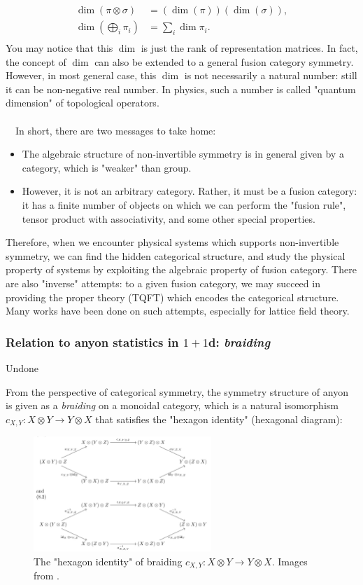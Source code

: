 \documentclass{ltjsarticle}
\theoremstyle{mystyle} %
\numberwithin{equation}{section}
\begin{document}
  \begin{align}
    \dim{(\pi \otimes \sigma)} &= (\dim(\pi))(\dim(\sigma)), \\
    \dim(\bigoplus_i \pi_i) &= \sum_i \dim{\pi_i}. \\
  \label{dim}
  \end{align}
  You may notice that this $\dim$ is just the rank of representation matrices. 
  In fact, the concept of $\dim$ can also be extended to a general fusion category symmetry. 
  However, in most general case, this $\dim$ is not necessarily a natural number: still it can be non-negative real number. 
  In physics, such a number is called "quantum dimension" of topological operators. 
  \\
  \\
  　In short, there are two messages to take home: 
  \begin{itemize}
    \item The algebraic structure of non-invertible symmetry is in general given by a category, which is "weaker" than group. 
    \item However, it is not an arbitrary category. Rather, it must be a fusion category:
     it has a finite number of objects on which we can perform the "fusion rule", tensor product with associativity, and some other special properties. 
  \end{itemize}
Therefore, when we encounter physical systems which supports non-invertible symmetry, 
we can find the hidden categorical structure, and study the physical property of systems by exploiting the algebraic property of fusion category. 
There are also "inverse" attempts: to a given fusion category, we may succeed in providing the proper theory (TQFT) which encodes the categorical structure. 
Many works have been done on such attempts, especially for lattice field theory. 
\subsubsection{Relation to anyon statistics in $1+1$d: \textit{braiding}}
\color{red}
Undone
\color{black}

From the perspective of categorical symmetry, 
the symmetry structure of anyon is given as a \textit{braiding} on a monoidal category, 
which is a natural isomorphism $c_{X,Y}: X\otimes Y \to Y\otimes X$
 that satisfies the "hexagon identity" (hexagonal diagram): 
 \begin{figure}[H]
    \centering
    \includegraphics[width=0.6\textwidth]{hexagon.jpeg}
    \caption{The "hexagon identity" of braiding $c_{X,Y}: X\otimes Y \to Y\otimes X$. 
    Images from \cite{PESGDNVO}. }
    \label{lrunits}
\end{figure}
\end{document}
